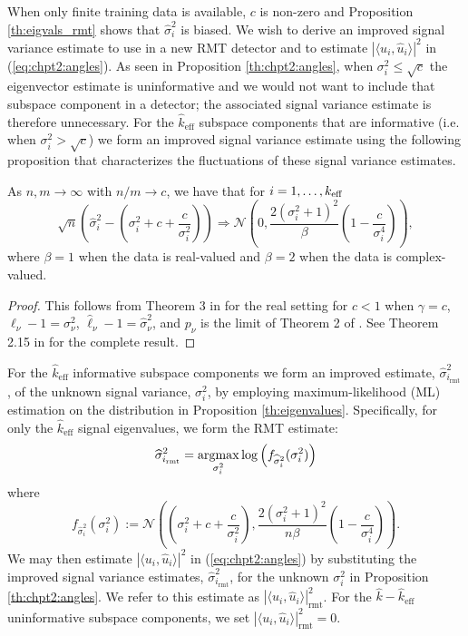 When only finite training data is available, $c$ is non-zero and Proposition \ref{th:eigvals_rmt} shows that $\widehat{\sigma}_i^2$ is biased. We wish to derive an improved signal variance estimate to use in a new RMT detector and to estimate $|\langle u_i,\widehat{u}_i\rangle|^2$ in (\ref{eq:chpt2:angles}). As seen in Proposition \ref{th:chpt2:angles}, when $\sigma_i^2\leq\sqrt{c}$ the eigenvector estimate is uninformative and we would not want to include that subspace component in a detector; the associated signal variance estimate is therefore unnecessary. For the $\widehat{k}_{\text{eff}}$ subspace components that are informative (i.e. when $\sigma_i^2 > \sqrt{c}$) we form an improved signal variance estimate using the following proposition that characterizes the fluctuations of these signal variance estimates.
\begin{prop}\label{th:eigenvalues}
As $n,m \longrightarrow \infty$ with $n/m \to c$, we have that for $i = 1, \ldots, k_\text{eff}$
\begin{equation*}
\sqrt{n}\left(\widehat{\sigma}_i^2-\left(\sigma_i^2+c+\frac{c}{\sigma_i^2}\right)\right)\Rightarrow\mathcal{N}\left(0,\frac{2\left(\sigma_i^2+1\right)^2}{\beta }\left(1-\frac{c}{\sigma_i^4}\right)\right),
\end{equation*}
where $\beta = 1$ when the data is real-valued and $\beta = 2$ when the data is complex-valued.
\end{prop}
\begin{proof}
This follows from Theorem 3 in \cite{paul2007asymptotics} for the real setting for $c<1$ when $\gamma=c$, $\ell_\nu-1=\sigma_\nu^2$, $\widehat{\ell}_\nu-1=\widehat{\sigma}_\nu^2$, and $p_\nu$ is the limit of Theorem 2 of \cite{paul2007asymptotics}. See Theorem 2.15 in \cite{benaych2011singular} for the complete result.
\end{proof}
For the $\widehat{k}_{\text{eff}}$ informative subspace components we form an improved estimate, $\widehat{\sigma}^2_{i_\text{rmt}}$, of the unknown signal variance, $\sigma_{i}^{2}$, by employing maximum-likelihood (ML) estimation on the distribution in Proposition \ref{th:eigenvalues}. Specifically, for only the $\widehat{k}_{\text{eff}}$ signal eigenvalues, we form the RMT estimate:
\begin{equation}\label{eq:cov}
\widehat{\sigma}^2_{i_\text{rmt}} = \argmax_{\sigma_i^2} \log\left(f_{\widehat{\sigma}_i^2}(\sigma_i^2)\right)
\end{equation}
where
\begin{equation*}
f_{\widehat{\sigma}_i^2}(\sigma_i^2):=\mathcal{N}\left(\left(\sigma_i^2+c+\frac{c}{\sigma_i^2}\right),\frac{2\left(\sigma_i^2+1\right)^2}{n\beta }\left(1-\frac{c}{\sigma_i^4}\right)\right).
\end{equation*}
We may then estimate $|\langle u_i,\widehat{u}_i\rangle|^2$ in (\ref{eq:chpt2:angles}) by substituting the improved signal variance estimates, $\widehat{\sigma}^2_{i_\text{rmt}}$, for the unknown $\sigma_i^2$ in Proposition \ref{th:chpt2:angles}. We refer to this estimate as $|\langle u_i,\widehat{u}_i\rangle|^2_{\text{rmt}}$. For the $\widehat{k}-\widehat{k}_{\text{eff}}$ uninformative subspace components, we set $|\langle u_i,\widehat{u}_i\rangle|^2_{\text{rmt}}=0$.
